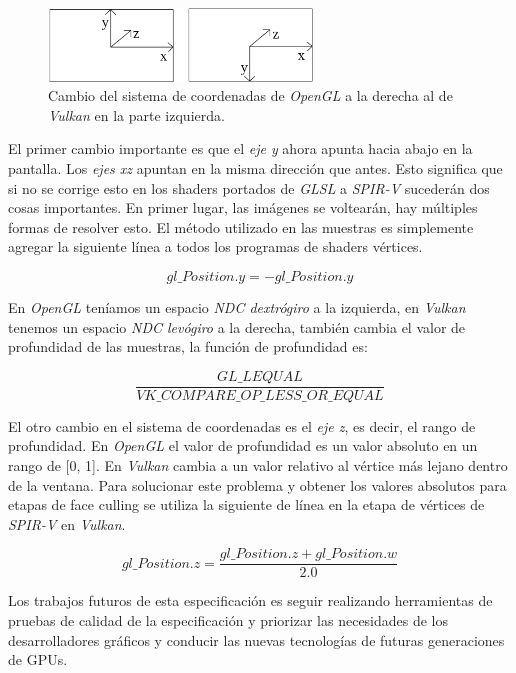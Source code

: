 \documentclass[a4paper]{book}
\begin{document}
\begin{figure}[H]
    \centering
    \includegraphics[width=7cm, keepaspectratio]{img/coordinateDiagram.png}
    \caption{Cambio del sistema de coordenadas de \textit{OpenGL} a la derecha al de \textit{Vulkan} en la parte izquierda.}
    \label{coordinateDiagram}
\end{figure}

El primer cambio importante es que el \textit{eje y} ahora apunta hacia abajo en la pantalla. Los \textit{ejes xz} apuntan en la misma
dirección que antes. Esto significa que si no se corrige esto en los shaders portados de \textit{GLSL} a \textit{SPIR-V} sucederán dos
cosas importantes. En primer lugar, las imágenes se voltearán, hay múltiples formas de resolver esto. El método
utilizado en las muestras es simplemente agregar la siguiente línea a todos los programas de shaders vértices.

\begin{equation} gl\_Position.y = -gl\_Position.y \end{equation}

En \textit{OpenGL} teníamos un espacio \textit{NDC dextrógiro} a la izquierda, en \textit{Vulkan} tenemos un espacio \textit{NDC levógiro}
a la derecha, también cambia el valor de profundidad de las muestras, la función de profundidad es:

\begin{equation} \frac{GL\_LEQUAL}  {VK\_COMPARE\_OP\_LESS\_OR\_EQUAL} \end{equation}

El otro cambio en el sistema de coordenadas es el \textit{eje z}, es decir, el rango de profundidad. En \textit{OpenGL} el valor de profundidad
es un valor absoluto en un rango de [0, 1]. En \textit{Vulkan} cambia a un valor relativo al vértice más lejano dentro de la ventana.
Para solucionar este problema y obtener los valores absolutos para etapas de face culling se utiliza la siguiente de línea
en la etapa de vértices de \textit{SPIR-V} en \textit{Vulkan}.

\begin{equation} gl\_Position.z = \frac{gl\_Position.z + gl\_Position.w} {2.0} \end{equation}

Los trabajos futuros de esta especificación es seguir realizando herramientas de pruebas de calidad de la especificación
y priorizar las necesidades de los desarrolladores gráficos y conducir las nuevas tecnologías de futuras generaciones de GPUs. \cite{vulkan:_system}
\end{document}
